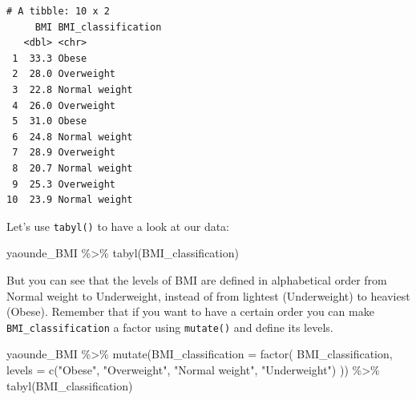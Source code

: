 \documentclass[
  letterpaper,
  DIV=11,
  numbers=noendperiod]{scrreprt}
\newenvironment{Shaded}{\begin{snugshade}}{\end{snugshade}}
\newcommand{\AttributeTok}[1]{\textcolor[rgb]{0.40,0.45,0.13}{#1}}
\newcommand{\FunctionTok}[1]{\textcolor[rgb]{0.28,0.35,0.67}{#1}}
\newcommand{\NormalTok}[1]{\textcolor[rgb]{0.00,0.23,0.31}{#1}}
\newcommand{\SpecialCharTok}[1]{\textcolor[rgb]{0.37,0.37,0.37}{#1}}
\newcommand{\StringTok}[1]{\textcolor[rgb]{0.13,0.47,0.30}{#1}}
\begin{document}
\begin{verbatim}
# A tibble: 10 x 2
     BMI BMI_classification
   <dbl> <chr>             
 1  33.3 Obese             
 2  28.0 Overweight        
 3  22.8 Normal weight     
 4  26.0 Overweight        
 5  31.0 Obese             
 6  24.8 Normal weight     
 7  28.9 Overweight        
 8  20.7 Normal weight     
 9  25.3 Overweight        
10  23.9 Normal weight     
\end{verbatim}

Let's use \texttt{tabyl()} to have a look at our data:

\begin{Shaded}
\begin{Highlighting}[]
\NormalTok{yaounde\_BMI }\SpecialCharTok{\%\textgreater{}\%}
  \FunctionTok{tabyl}\NormalTok{(BMI\_classification)}
\end{Highlighting}
\end{Shaded}

But you can see that the levels of BMI are defined in alphabetical order
from Normal weight to Underweight, instead of from lightest
(Underweight) to heaviest (Obese). Remember that if you want to have a
certain order you can make \texttt{BMI\_classification} a factor using
\texttt{mutate()} and define its levels.

\begin{Shaded}
\begin{Highlighting}[]
\NormalTok{yaounde\_BMI }\SpecialCharTok{\%\textgreater{}\%}
  \FunctionTok{mutate}\NormalTok{(}\AttributeTok{BMI\_classification =} \FunctionTok{factor}\NormalTok{(}
\NormalTok{    BMI\_classification,}
    \AttributeTok{levels =} \FunctionTok{c}\NormalTok{(}\StringTok{"Obese"}\NormalTok{,}
               \StringTok{"Overweight"}\NormalTok{,}
               \StringTok{"Normal weight"}\NormalTok{,}
               \StringTok{"Underweight"}\NormalTok{)}
\NormalTok{  )) }\SpecialCharTok{\%\textgreater{}\%}
  \FunctionTok{tabyl}\NormalTok{(BMI\_classification)}
\end{Highlighting}
\end{Shaded}
\end{document}
